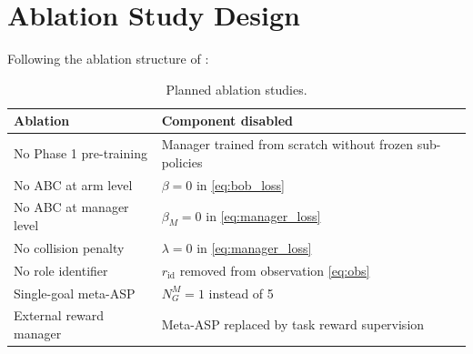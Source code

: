 \documentclass[12pt, a4paper]{article}
\begin{document}
\section{Ablation Study Design}
\label{sec:ablations}

Following the ablation structure of \citet{plappert2021asymmetric}:

\begin{table}[h!]
\centering
\caption{Planned ablation studies.}
\begin{tabular}{ll}
\toprule
Ablation & Component disabled \\
\midrule
No Phase 1 pre-training & Manager trained from scratch without frozen sub-policies \\
No ABC at arm level & $\beta = 0$ in \cref{eq:bob_loss} \\
No ABC at manager level & $\beta_M = 0$ in \cref{eq:manager_loss} \\
No collision penalty & $\lambda = 0$ in \cref{eq:manager_loss} \\
No role identifier & $r_{\mathrm{id}}$ removed from observation \cref{eq:obs} \\
Single-goal meta-ASP & $N_G^M = 1$ instead of 5 \\
External reward manager & Meta-ASP replaced by task reward supervision \\
\bottomrule
\end{tabular}
\label{tab:ablations}
\end{table}
\end{document}
